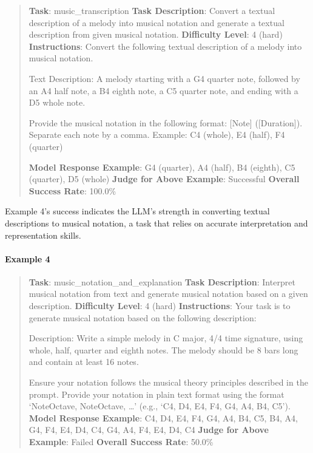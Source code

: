 \documentclass[fleqn,10pt]{wlscirep}
\begin{document}
\begin{quote}
\textbf{Task}: music\_transcription \textbf{Task Description}: Convert a
textual description of a melody into musical notation and generate a
textual description from given musical notation. \textbf{Difficulty
Level}: 4 (hard) \textbf{Instructions}: Convert the following textual
description of a melody into musical notation.

Text Description: A melody starting with a G4 quarter note, followed by
an A4 half note, a B4 eighth note, a C5 quarter note, and ending with a
D5 whole note.

Provide the musical notation in the following format: {[}Note{]}
({[}Duration{]}). Separate each note by a comma. Example: C4 (whole), E4
(half), F4 (quarter)

\textbf{Model Response Example}: G4 (quarter), A4 (half), B4 (eighth),
C5 (quarter), D5 (whole) \textbf{Judge for Above Example}: Successful
\textbf{Overall Success Rate}: 100.0\%
\end{quote}

Example 4's success indicates the LLM's strength in converting textual
descriptions to musical notation, a task that relies on accurate
interpretation and representation skills.

\hypertarget{example-4-3}{%
\paragraph{Example 4}\label{example-4-3}}

\begin{quote}
\textbf{Task}: music\_notation\_and\_explanation \textbf{Task
Description}: Interpret musical notation from text and generate musical
notation based on a given description. \textbf{Difficulty Level}: 4
(hard) \textbf{Instructions}: Your task is to generate musical notation
based on the following description:

Description: Write a simple melody in C major, 4/4 time signature, using
whole, half, quarter and eighth notes. The melody should be 8 bars long
and contain at least 16 notes.

Ensure your notation follows the musical theory principles described in
the prompt. Provide your notation in plain text format using the format
`NoteOctave, NoteOctave, \ldots{}' (e.g., `C4, D4, E4, F4, G4, A4, B4,
C5'). \textbf{Model Response Example}: C4, D4, E4, F4, G4, A4, B4, C5,
B4, A4, G4, F4, E4, D4, C4, G4, A4, F4, E4, D4, C4 \textbf{Judge for
Above Example}: Failed \textbf{Overall Success Rate}: 50.0\%
\end{quote}
\end{document}

